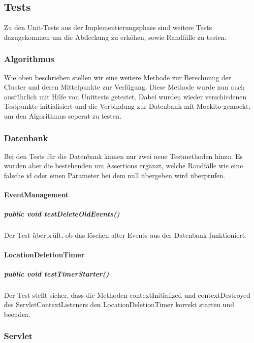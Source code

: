 \documentclass{scrartcl}
\begin{document}
\subsection{Tests}
Zu den Unit-Tests aus der Implementierungsphase sind weitere Tests dazugekommen um die Abdeckung zu erhöhen, sowie Randfälle zu testen.
\subsubsection{Algorithmus}
Wie oben beschrieben stellen wir eine weitere Methode zur Berechnung der Cluster und deren Mittelpunkte zur Verfügung. Diese Methode wurde nun auch ausführlich mit Hilfe von Unittests getestet. Dabei wurden wieder verschiedenen Testpunkte initialisiert und die Verbindung zur Datenbank mit Mockito gemockt, um den Algorithmus seperat zu testen.
\subsubsection{Datenbank}
Bei den Tests für die Datenbank kamen nur zwei neue Testmethoden hinzu.
Es wurden aber die bestehenden um Assertions ergänzt, welche Randfälle wie eine falsche id oder einen Parameter bei dem null übergeben wird überprüfen.
\paragraph{EventManagement}
\subparagraph{public void testDeleteOldEvents()}
Der Test überprüft, ob das löschen alter Events aus der Datenbank funktioniert.
\paragraph{LocationDeletionTimer}
\subparagraph{public void testTimerStarter()}
Der Test stellt sicher, dass die Methoden contextInitialized und contextDestroyed des ServletContextListeners den LocationDeletionTimer korrekt starten und beenden.


\subsubsection{Servlet}
\end{document}
